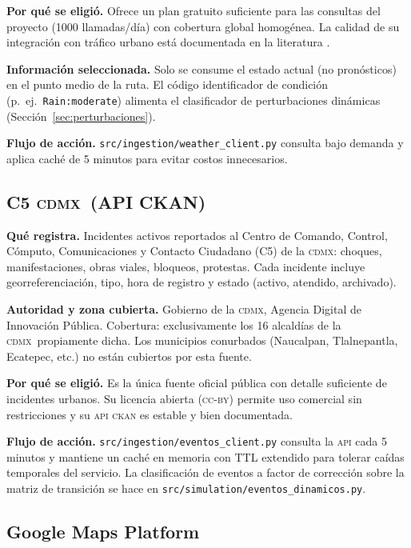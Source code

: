 \documentclass[11pt,a4paper]{article}
\newcommand{\CDMX}{\textsc{cdmx}}
\begin{document}
\textbf{Por qué se eligió.} Ofrece un plan gratuito suficiente
para las consultas del proyecto (\num{1000} llamadas/día) con
cobertura global homogénea. La calidad de su integración con
tráfico urbano está documentada en la literatura
\citep{owm2023traffic}.

\textbf{Información seleccionada.} Solo se consume el estado
actual (no pronósticos) en el punto medio de la ruta. El código
identificador de condición (p.\ ej.\ \texttt{Rain:moderate})
alimenta el clasificador de perturbaciones dinámicas
(Sección~\ref{sec:perturbaciones}).

\textbf{Flujo de acción.}
\texttt{src/ingestion/weather\_client.py} consulta bajo demanda y
aplica caché de \num{5} minutos para evitar costos innecesarios.

\subsection{C5 \CDMX\ (API CKAN)}

\textbf{Qué registra.} Incidentes activos reportados al Centro
de Comando, Control, Cómputo, Comunicaciones y Contacto
Ciudadano (C5) de la \CDMX: choques, manifestaciones, obras
viales, bloqueos, protestas. Cada incidente incluye
georreferenciación, tipo, hora de registro y estado (activo,
atendido, archivado).

\textbf{Autoridad y zona cubierta.} Gobierno de la \CDMX, Agencia
Digital de Innovación Pública. Cobertura: exclusivamente los
\num{16} alcaldías de la \CDMX\ propiamente dicha. Los municipios
conurbados (Naucalpan, Tlalnepantla, Ecatepec, etc.) no están
cubiertos por esta fuente.

\textbf{Por qué se eligió.} Es la única fuente oficial pública
con detalle suficiente de incidentes urbanos. Su licencia abierta
(\textsc{cc-by}) permite uso comercial sin restricciones y su
\textsc{api ckan} es estable y bien documentada.

\textbf{Flujo de acción.}
\texttt{src/ingestion/eventos\_client.py} consulta la \textsc{api}
cada \num{5} minutos y mantiene un caché en memoria con TTL
extendido para tolerar caídas temporales del servicio. La
clasificación de eventos a factor de corrección sobre la matriz
de transición se hace en
\texttt{src/simulation/eventos\_dinamicos.py}.

\subsection{Google Maps Platform}
\end{document}
